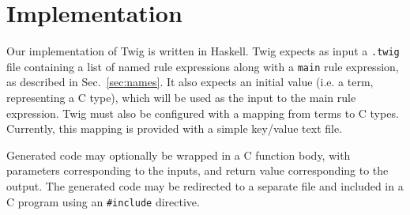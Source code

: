 
\section{Implementation}

Our implementation of Twig is written in Haskell. Twig expects as
input a \texttt{.twig} file containing a list of named rule
expressions along with a \texttt{main} rule expression, as
described in Sec.~\ref{sec:names}. It also expects an initial
value (i.e. a term, representing a C type), which will be used as
the input to the main rule expression. Twig must also be
configured with a mapping from terms to C types. Currently, this
mapping is provided with a simple key/value text file.

Generated code may optionally be wrapped in a C function body,
with parameters corresponding to the inputs, and return value
corresponding to the output. The generated code may be redirected
to a separate file and included in a C program using an
\texttt{\#include} directive.
